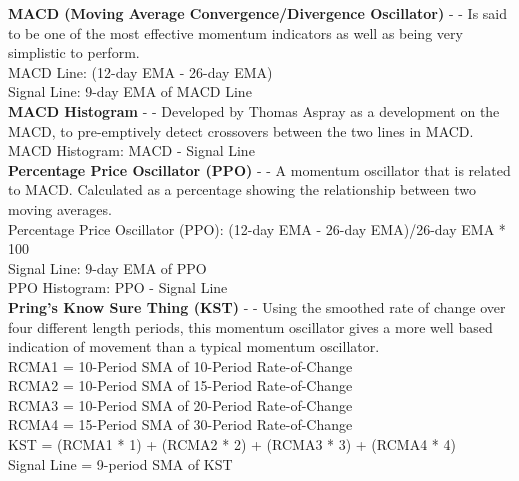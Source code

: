 \documentclass[conference]{IEEEtran}
\begin{document}

\noindent
\textbf{MACD (Moving Average Convergence/Divergence Oscillator)} - \cite{Appel2005} - Is said to be one of the most effective momentum indicators as well as being very simplistic to perform. \\

\noindent
MACD Line: (12-day EMA - 26-day EMA)\\
Signal Line: 9-day EMA of MACD Line\\

\noindent
\textbf{MACD Histogram} - \cite{Murphy1999} - Developed by Thomas Aspray as a development on the MACD, to pre-emptively detect crossovers between the two lines in MACD.\\

\noindent
MACD Histogram: MACD - Signal Line \\

\noindent
\textbf{Percentage Price Oscillator (PPO)} - \cite{Murphy1999} - A momentum oscillator that is related to MACD. Calculated as a percentage showing the relationship between two moving averages. \\

\noindent
Percentage Price Oscillator (PPO): {(12-day EMA - 26-day EMA)/26-day EMA} * 100 \\
Signal Line: 9-day EMA of PPO \\
PPO Histogram: PPO - Signal Line \\

\noindent
\textbf{Pring's Know Sure Thing (KST)} - \cite{Pring2002} - Using the smoothed rate of change over four different length periods, this momentum oscillator gives a more well based indication of movement than a typical momentum oscillator. \\

\noindent
RCMA1 = 10-Period SMA of 10-Period Rate-of-Change \\
RCMA2 = 10-Period SMA of 15-Period Rate-of-Change \\
RCMA3 = 10-Period SMA of 20-Period Rate-of-Change \\
RCMA4 = 15-Period SMA of 30-Period Rate-of-Change \\
KST = (RCMA1 * 1) + (RCMA2 * 2) + (RCMA3 * 3) + (RCMA4 * 4) \\
Signal Line = 9-period SMA of KST \\
\end{document}

